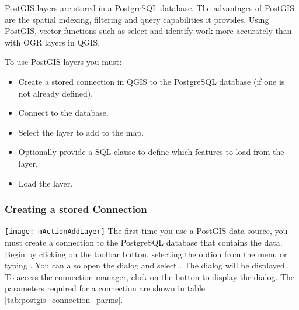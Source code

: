 PostGIS layers are stored in a PostgreSQL database. The advantages of PostGIS
are the spatial indexing, filtering and query capabilities it provides. Using PostGIS,
vector functions such as select and identify work more accurately than with
OGR layers in QGIS.

To use PostGIS layers you must:

\begin{itemize}
\item Create a stored connection in QGIS to the PostgreSQL database (if one is
not already defined).
\item Connect to the database.
\item Select the layer to add to the map.
\item Optionally provide a SQL 
clause to define which features
to load from the layer.
\item Load the layer.
\end{itemize}

\subsubsection{Creating a stored
Connection}\label{sec:postgis_stored}

\texttt{[image: mActionAddLayer]} The first time
you use a PostGIS data source, you must create a connection to the PostgreSQL
database that contains the data. Begin by clicking on the
 toolbar button, selecting the
 option from the
 menu or typing . You can also
open the  dialog and select .
The  dialog will
be displayed. To access the connection manager, click on the  button to display the  dialog. The parameters required for a connection are shown
in table \ref{tab:postgis_connection_parms}.

